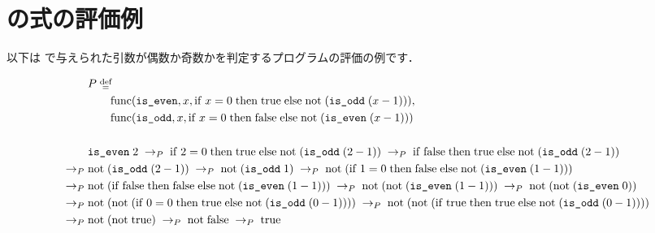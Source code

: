 
\section{\Yil の式の評価例}
\label{sec:lang:semantics:example}

\par 以下は \Yil で与えられた引数が偶数か奇数かを判定するプログラムの評価の例です．


\begin{align*}
  & P \; \defeq \; \\
  &\quad\quad \Func{\code{is\_even}}{x}{\If{x = 0}{\true}{\App{\mathrm{not}}{\paren{\App{\code{is\_odd}}{\paren{x - 1}}}}}}, \\
  &\quad\quad \Func{\code{is\_odd}}{x}{\If{x = 0}{\false}{\App{\mathrm{not}}{\paren{\App{\code{is\_even}}{\paren{x - 1}}}}}} \\\\
  & \Reduce{P}
      {\App{\code{is\_even}}{2}}
      {\Reduce{P}
        {\If{2 = 0}{\true}{\App{\mathrm{not}}{\paren{\App{\code{is\_odd}}{\paren{2-1}}}}}}
      {\Reduce{P}
        {\If{\false}{\true}{\App{\mathrm{not}}{\paren{\App{\code{is\_odd}}{\paren{2-1}}}}} \\}
      {&\Reduce{P}
        {\App{\mathrm{not}}{\paren{\App{\code{is\_odd}}{\paren{2-1}}}}}
      {\Reduce{P}
        {\App{\mathrm{not}}{\paren{\App{\code{is\_odd}}{1}}}}
      {\Reduce{P}
        {\App{\mathrm{not}}{\paren{\If{1 = 0}{\false}{\App{\mathrm{not}}{\paren{\App{\code{is\_even}}{\paren{1-1}}}}}}} \\}
      {&\Reduce{P}
        {\App{\mathrm{not}}{\paren{\If{\false}{\false}{\App{\mathrm{not}}{\paren{\App{\code{is\_even}}{\paren{1-1}}}}}}}}
      {\Reduce{P}
        {\App{\mathrm{not}}{\paren{\App{\mathrm{not}}{\paren{\App{\code{is\_even}}{\paren{1-1}}}}}}}
      {\Reduce{P}
        {\App{\mathrm{not}}{\paren{\App{\mathrm{not}}{\paren{\App{\code{is\_even}}{0}}}}} \\}
      {&\Reduce{P}
        {\App{\mathrm{not}}{\paren{\App{\mathrm{not}}{\paren{\If{0 = 0}{\true}{\App{\mathrm{not}}{\paren{\App{\code{is\_odd}}{\paren{0-1}}}}}}}}}}
      {\Reduce{P}
        {\App{\mathrm{not}}{\paren{\App{\mathrm{not}}{\paren{\If{\true}{\true}{\App{\mathrm{not}}{\paren{\App{\code{is\_odd}}{\paren{0-1}}}}}}}}} \\}
      {&\Reduce{P}
        {\App{\mathrm{not}}{\paren{\App{\mathrm{not}}{\true}}}}
      {\Reduce{P}{\App{\mathrm{not}}{\false}}{\true}}
}}}}}}}}}}}
\end{align*}
